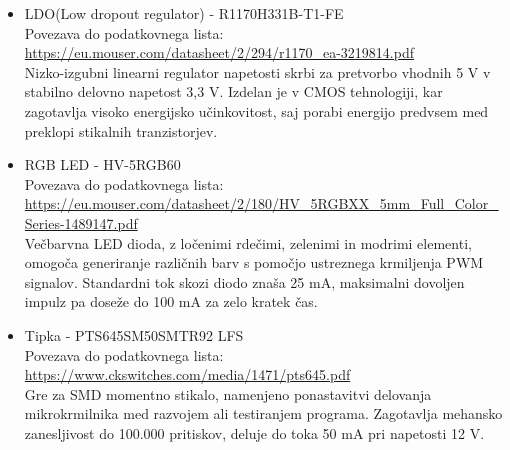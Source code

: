 \begin{itemize}
    \item LDO(Low dropout regulator) - R1170H331B-T1-FE \\
    Povezava do podatkovnega lista: \url{https://eu.mouser.com/datasheet/2/294/r1170_ea-3219814.pdf} \\
    Nizko-izgubni linearni regulator napetosti skrbi za pretvorbo vhodnih 5 V v stabilno delovno napetost 3,3 V. Izdelan je v CMOS tehnologiji, kar zagotavlja visoko energijsko učinkovitost, saj porabi energijo predvsem med preklopi stikalnih tranzistorjev.
    
    \item RGB LED - HV-5RGB60 \\
    Povezava do podatkovnega lista: \url{https://eu.mouser.com/datasheet/2/180/HV_5RGBXX_5mm_Full_Color_Series-1489147.pdf} \\
    Večbarvna LED dioda, z ločenimi rdečimi, zelenimi in modrimi elementi, omogoča generiranje različnih barv s pomočjo ustreznega krmiljenja PWM signalov. Standardni tok skozi diodo znaša 25 mA, maksimalni dovoljen impulz pa doseže do 100 mA za zelo kratek čas.
    
    \item Tipka - PTS645SM50SMTR92 LFS  \\
    Povezava do podatkovnega lista: \url{https://www.ckswitches.com/media/1471/pts645.pdf}  \\   
    Gre za SMD momentno stikalo, namenjeno ponastavitvi delovanja mikrokrmilnika med razvojem ali testiranjem programa. Zagotavlja mehansko zanesljivost do 100.000 pritiskov,  deluje do toka 50 mA pri napetosti 12 V.
    

\end{itemize}
